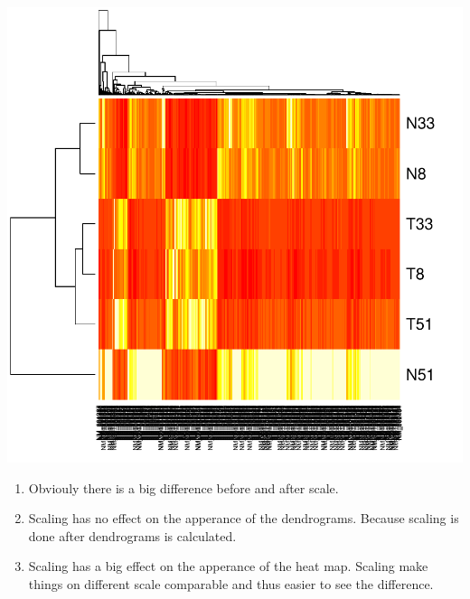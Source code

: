 \documentclass[a4paper]{article}
\begin{document}
\includegraphics{pca-2a}
{\color{red}
\begin{enumerate}
\item Obviouly there is a big difference before and after scale.
\item Scaling has no effect on the apperance of the dendrograms. Because scaling is done after dendrograms is calculated.
\item Scaling has a big effect on the apperance of the heat map. Scaling make things on different scale comparable and thus easier to see the difference.
\end{enumerate}
}
\end{document}

